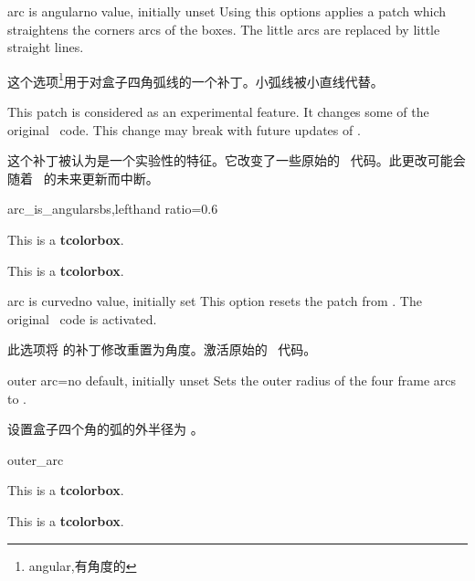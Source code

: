   

\begin{docTcbKey}[][doc new=2015-05-05]{arc is angular}{}{no value, initially unset}
  Using this options applies a patch which straightens the corners arcs of
  the boxes. The little arcs are replaced by little straight lines.
  
  这个选项\footnote{angular,有角度的}用于对盒子四角弧线的一个补丁。小弧线被小直线代替。
  \begin{marker}
  This patch is considered as an experimental feature.
  It changes some of the original \tikzname\ code. This change may break
  with future updates of \tikzname.
  
  这个补丁被认为是一个实验性的特征。它改变了一些原始的 \tikzname\ 代码。此更改可能会随着 \tikzname\ 的未来更新而中断。
  \end{marker}
  
  \begin{exdispExample*}{arc_is_angular}{sbs,lefthand ratio=0.6}
  
  \begin{tcolorbox}
  This is a \textbf{tcolorbox}.
  \end{tcolorbox}
  \begin{tcolorbox}
  This is a \textbf{tcolorbox}.
  \end{tcolorbox}
  \end{exdispExample*}
  
  \end{docTcbKey}
  
  
  \begin{docTcbKey}[][doc new=2015-05-05]{arc is curved}{}{no value, initially set}
    This option resets the patch from . The
    original \tikzname\ code is activated.
  
  此选项将  的补丁修改重置为角度。激活原始的 \tikzname\ 代码。
  \end{docTcbKey}
  
  
  \begin{docTcbKey}{outer arc}{=}{no default, initially unset}
    Sets the outer radius of the four frame arcs to .

  设置盒子四个角的弧的外半径为 。
  
  \begin{exdispExample}{outer_arc}
  
  \begin{tcolorbox}[arc=4mm,outer arc=1mm]
  This is a \textbf{tcolorbox}.
  \end{tcolorbox}
  \begin{tcolorbox}[arc=4mm]
    This is a \textbf{tcolorbox}.
  \end{tcolorbox}
  \end{exdispExample}
  \end{docTcbKey}
  
